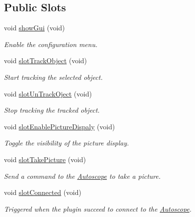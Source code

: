 \subsection*{Public Slots}
\begin{DoxyCompactItemize}
\item 
void \mbox{\hyperlink{class_autoscope_a2a3fc7df788580d91949351f687eab7a}{show\+Gui}} (void)
\begin{DoxyCompactList}\small\item\em Enable the configuration menu. \end{DoxyCompactList}\item 
void \mbox{\hyperlink{class_autoscope_ae0c39815fab1084effd39f87e56febf3}{slot\+Track\+Object}} (void)
\begin{DoxyCompactList}\small\item\em Start tracking the selected object. \end{DoxyCompactList}\item 
void \mbox{\hyperlink{class_autoscope_a47d7fbe1a8bcf025ef57b45ead2bcf6e}{slot\+Un\+Track\+Oject}} (void)
\begin{DoxyCompactList}\small\item\em Stop tracking the tracked object. \end{DoxyCompactList}\item 
void \mbox{\hyperlink{class_autoscope_a9216c1ee654d8da28d331b3020b6e27d}{slot\+Enable\+Picture\+Dispaly}} (void)
\begin{DoxyCompactList}\small\item\em Toggle the visibility of the picture display. \end{DoxyCompactList}\item 
void \mbox{\hyperlink{class_autoscope_a55c4956c3a71198b70cf19fea503a776}{slot\+Take\+Picture}} (void)
\begin{DoxyCompactList}\small\item\em Send a command to the \mbox{\hyperlink{class_autoscope}{Autoscope}} to take a picture. \end{DoxyCompactList}\item 
void \mbox{\hyperlink{class_autoscope_ae85d6642b5db861e226a6a261c5c0a37}{slot\+Connected}} (void)
\begin{DoxyCompactList}\small\item\em Triggered when the plugin succeed to connect to the \mbox{\hyperlink{class_autoscope}{Autoscope}}. \end{DoxyCompactList}\end{DoxyCompactItemize}
